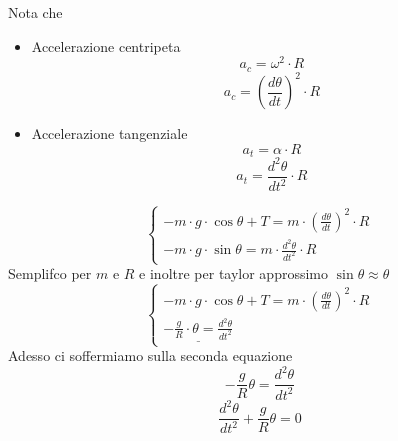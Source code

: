 \documentclass[twoside]{article}
\begin{document}
Nota che
\begin{itemize}
  \item Accelerazione centripeta \begin{equation*}
          a_c = \omega^2 \cdot R
        \end{equation*}
        \begin{equation*}
          a_c = \left(\frac{d\theta}{dt}\right)^2 \cdot R
        \end{equation*}

  \item Accelerazione tangenziale \begin{equation*}
          a_t = \alpha \cdot R
        \end{equation*}
        \begin{equation*}
          a_t = \frac{d^2\theta}{dt^2} \cdot R
        \end{equation*}
\end{itemize}

\begin{equation*}
  \begin{cases}
    \displaystyle -m \cdot g \cdot \cos{\theta} + T = m \cdot \left(\frac{d\theta}{dt}\right)^2 \cdot R \\
    \displaystyle - m \cdot g \cdot \sin{\theta} = m \cdot \frac{d^2\theta}{dt^2} \cdot R
  \end{cases}
\end{equation*}
Semplifco per $m$ e $R$ e inoltre per taylor approssimo $\sin{\theta} \approx \theta$
\begin{equation*}
  \begin{cases}
    \displaystyle -m \cdot g \cdot \cos{\theta} + T = m \cdot \left(\frac{d\theta}{dt}\right)^2 \cdot R \\
    \displaystyle \underline{- \frac{g}{R} \cdot \theta = \frac{d^2\theta}{dt^2}}
  \end{cases}
\end{equation*}
Adesso ci soffermiamo sulla seconda equazione
\begin{equation*}
  \displaystyle - \frac{g}{R} \theta = \frac{d^2\theta}{dt^2}
\end{equation*}
\begin{equation*}
  \displaystyle \frac{d^2\theta}{dt^2} + \frac{g}{R}\theta = 0
\end{equation*}
\end{document}
